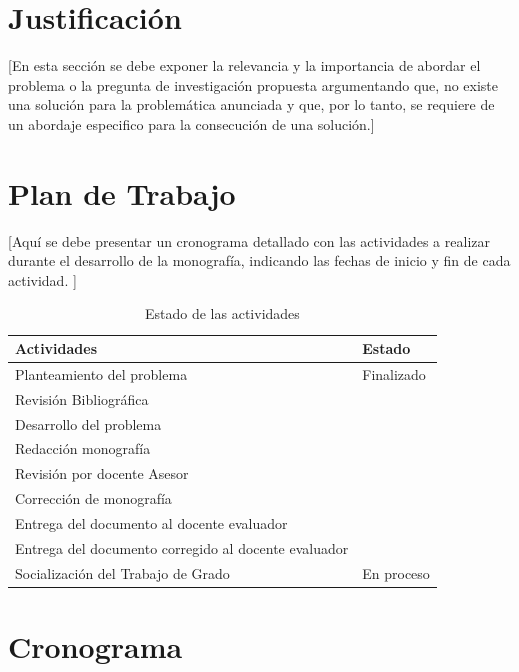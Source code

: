 \documentclass[12pt,twoside,letterpaper]{article}
\begin{document}
\section{Justificación}

[En esta sección se debe exponer la relevancia y la importancia de abordar el problema o la pregunta de investigación propuesta
argumentando que, no existe una solución para la problemática anunciada y que, por lo
tanto, se requiere de un abordaje especifico para la consecución de una solución.]






\section{Plan de Trabajo}

[Aquí se debe presentar un cronograma detallado con las actividades a realizar durante el desarrollo de la monografía, indicando las fechas de inicio y fin de cada actividad.
]

\begin{table}[htbp]
\centering
\begin{tabular}{@{}ll@{}}
\toprule
\textbf{Actividades} & \textbf{Estado} \\ 
\midrule
Planteamiento del problema & Finalizado \\ 
Revisión Bibliográfica & \\ 
Desarrollo del problema & \\ 
Redacción monografía & \\ 
Revisión  por docente Asesor & \\ 
Corrección de monografía & \\ 
Entrega del documento al docente evaluador & \\ 
Entrega del documento corregido al docente evaluador \hspace{2cm} & \\ 
Socialización del Trabajo de Grado & En proceso \\ \bottomrule
\end{tabular}
\caption{Estado de las actividades}
\label{tab:estado_actividades}
\end{table}





\section{Cronograma}
\end{document}
